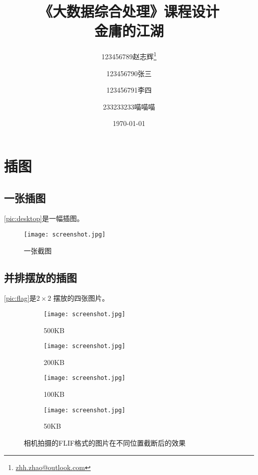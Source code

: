 \documentclass{dreamClass}
\title{
    \vspace{-50pt}
    \textbf{\Huge《大数据综合处理》课程设计}\\
    \textbf{\huge 金庸的江湖}
}
\author[1]{123456789赵志辉\thanks{\href{mailto:zhh.zhao@outlook.com}{zhh.zhao@outlook.com}}}
\author[1]{123456790张三}
\author[1]{123456791李四}
\author[2]{233233233喵喵喵}
\affil[1]{计算机科学与技术系，九乡河文理学院}
\affil[2]{喵喵喵，B612星球}
\date{\today}
\begin{document}
\maketitle
\thispagestyle{empty}

\section{插图}
\subsection{一张插图}
\autoref{pic:desktop}是一幅插图。
\begin{figure}[H]
    \centering
    \texttt{[image: screenshot.jpg]}
    \caption{一张截图}\label{pic:desktop}
\end{figure}
\subsection{并排摆放的插图}
\autoref{pic:flag}是\(2 \times 2\) 摆放的四张图片。
\begin{figure}
    \centering
    \begin{subfigure}{.5\textwidth}
        \centering
        \texttt{[image: screenshot.jpg]}
        \caption{500KB}
    \end{subfigure}%
    \begin{subfigure}{.5\textwidth}
        \centering
        \texttt{[image: screenshot.jpg]}
        \caption{200KB}
    \end{subfigure}

    \begin{subfigure}{.5\textwidth}
        \centering
        \texttt{[image: screenshot.jpg]}
        \caption{100KB}
    \end{subfigure}%
    \begin{subfigure}{.5\textwidth}
        \centering
        \texttt{[image: screenshot.jpg]}
        \caption{50KB}
    \end{subfigure}
    \caption{相机拍摄的FLIF格式的图片在不同位置截断后的效果\label{pic:flag}}
\end{figure}
\end{document}
